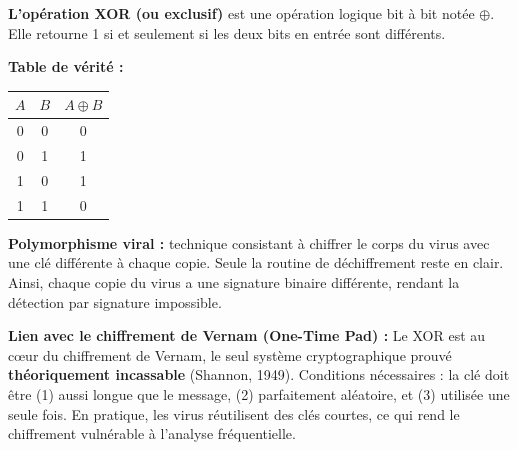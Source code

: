 \documentclass[a4paper,11pt]{article}
\theoremstyle{plain}
\theoremstyle{definition}
\begin{document}
\begin{rappel}
\textbf{L'opération XOR (ou exclusif)} est une opération logique bit à bit notée $\oplus$. Elle retourne 1 si et seulement si les deux bits en entrée sont différents.

\medskip
\textbf{Table de vérité :}

\begin{center}
\begin{tabular}{cc|c}
\toprule
$A$ & $B$ & $A \oplus B$ \\
\midrule
0 & 0 & 0 \\
0 & 1 & 1 \\
1 & 0 & 1 \\
1 & 1 & 0 \\
\bottomrule
\end{tabular}
\end{center}

\medskip
\textbf{Polymorphisme viral :} technique consistant à chiffrer le corps du virus avec une clé différente à chaque copie. Seule la routine de déchiffrement reste en clair. Ainsi, chaque copie du virus a une signature binaire différente, rendant la détection par signature impossible.

\medskip
\textbf{Lien avec le chiffrement de Vernam (One-Time Pad) :} Le XOR est au c\oe ur du chiffrement de Vernam, le seul système cryptographique prouvé \textbf{théoriquement incassable} (Shannon, 1949). Conditions nécessaires : la clé doit être (1) aussi longue que le message, (2) parfaitement aléatoire, et (3) utilisée une seule fois. En pratique, les virus réutilisent des clés courtes, ce qui rend le chiffrement vulnérable à l'analyse fréquentielle.
\end{rappel}
\end{document}
